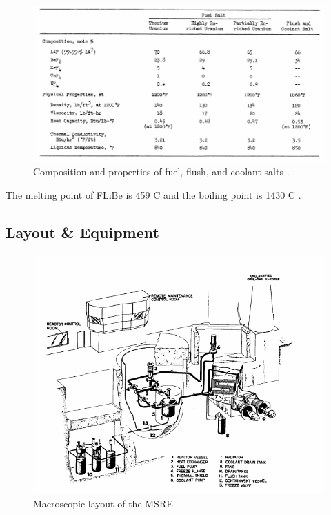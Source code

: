 \documentclass{article}
\let\Oldsubsection\subsection
\renewcommand{\subsection}{\FloatBarrier\Oldsubsection}
\begin{document}
\begin{figure}[htpb]
  \centering
  \includegraphics[max height=.5\textheight,max width=\textwidth,keepaspectratio]{salt_properties.png}
  \caption{Composition and properties of fuel, flush, and coolant
    salts \cite{robertson_msre_1965}.}
  \label{fig:salt_properties}
\end{figure}

The melting point of FLiBe is 459 \textdegree C and the boiling point is 1430
\textdegree C \cite{_flibe_2016}.

\subsection{Layout \& Equipment}

\begin{figure}[htpb]
  \centering
  \includegraphics[max height=.5\textheight,max width=\textwidth,keepaspectratio]{flow_diagram.png}
  \caption{Macroscopic layout of the \gls{MSRE} \cite{robertson_msre_1965}}
  \label{fig:MSRE_layout}
\end{figure}
\end{document}
